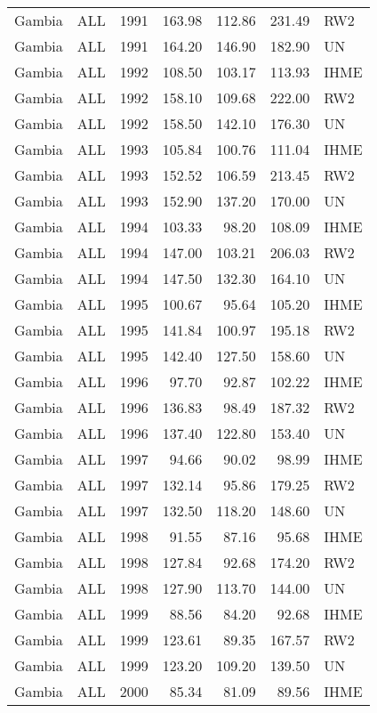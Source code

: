 \begin{longtable}{lllrrrl}
  Gambia & ALL & 1991 & 163.98 & 112.86 & 231.49 & RW2 \\ 
  Gambia & ALL & 1991 & 164.20 & 146.90 & 182.90 & UN \\ 
  Gambia & ALL & 1992 & 108.50 & 103.17 & 113.93 & IHME \\ 
  Gambia & ALL & 1992 & 158.10 & 109.68 & 222.00 & RW2 \\ 
  Gambia & ALL & 1992 & 158.50 & 142.10 & 176.30 & UN \\ 
  Gambia & ALL & 1993 & 105.84 & 100.76 & 111.04 & IHME \\ 
  Gambia & ALL & 1993 & 152.52 & 106.59 & 213.45 & RW2 \\ 
  Gambia & ALL & 1993 & 152.90 & 137.20 & 170.00 & UN \\ 
  Gambia & ALL & 1994 & 103.33 & 98.20 & 108.09 & IHME \\ 
  Gambia & ALL & 1994 & 147.00 & 103.21 & 206.03 & RW2 \\ 
  Gambia & ALL & 1994 & 147.50 & 132.30 & 164.10 & UN \\ 
  Gambia & ALL & 1995 & 100.67 & 95.64 & 105.20 & IHME \\ 
  Gambia & ALL & 1995 & 141.84 & 100.97 & 195.18 & RW2 \\ 
  Gambia & ALL & 1995 & 142.40 & 127.50 & 158.60 & UN \\ 
  Gambia & ALL & 1996 & 97.70 & 92.87 & 102.22 & IHME \\ 
  Gambia & ALL & 1996 & 136.83 & 98.49 & 187.32 & RW2 \\ 
  Gambia & ALL & 1996 & 137.40 & 122.80 & 153.40 & UN \\ 
  Gambia & ALL & 1997 & 94.66 & 90.02 & 98.99 & IHME \\ 
  Gambia & ALL & 1997 & 132.14 & 95.86 & 179.25 & RW2 \\ 
  Gambia & ALL & 1997 & 132.50 & 118.20 & 148.60 & UN \\ 
  Gambia & ALL & 1998 & 91.55 & 87.16 & 95.68 & IHME \\ 
  Gambia & ALL & 1998 & 127.84 & 92.68 & 174.20 & RW2 \\ 
  Gambia & ALL & 1998 & 127.90 & 113.70 & 144.00 & UN \\ 
  Gambia & ALL & 1999 & 88.56 & 84.20 & 92.68 & IHME \\ 
  Gambia & ALL & 1999 & 123.61 & 89.35 & 167.57 & RW2 \\ 
  Gambia & ALL & 1999 & 123.20 & 109.20 & 139.50 & UN \\ 
  Gambia & ALL & 2000 & 85.34 & 81.09 & 89.56 & IHME \\ 

\end{longtable}
